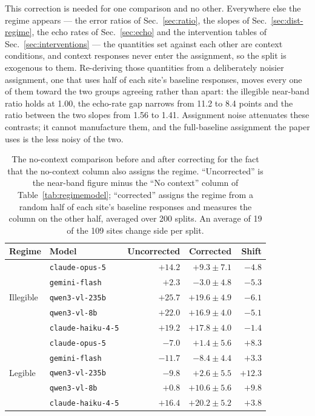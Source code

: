 \documentclass[10pt,a4paper]{article}
\begin{document}
This correction is needed for one comparison and no other. Everywhere else the
regime appears --- the error ratios of Sec.~\ref{sec:ratio}, the slopes of
Sec.~\ref{sec:dist-regime}, the echo rates of Sec.~\ref{sec:echo} and the
intervention tables of Sec.~\ref{sec:interventions} --- the quantities set
against each other are context conditions, and context responses never enter
the assignment, so the split is exogenous to them. Re-deriving those quantities
from a deliberately noisier assignment, one that uses half of each site's
baseline responses, moves every one of them toward the two groups agreeing
rather than apart: the illegible near-band ratio holds at \num{1.00}, the
echo-rate gap narrows from \num{11.2} to \num{8.4} points and the ratio between
the two slopes from \num{1.56} to \num{1.41}. Assignment noise attenuates these
contrasts; it cannot manufacture them, and the full-baseline assignment the
paper uses is the less noisy of the two.

\begin{table}[!htbp]
\centering
\small
\caption{The no-context comparison before and after correcting for the fact
that the no-context column also assigns the regime. ``Uncorrected'' is the
near-band figure minus the ``No context'' column of Table~\ref{tab:regimemodel};
``corrected'' assigns the regime from a random half of each site's baseline
responses and measures the column on the other half, averaged over \num{200}
splits. An average of \num{19} of the \num{109} sites change side per split.}
\label{tab:splithalf}
\begin{tabular}{llrrr}
\toprule
Regime & Model & Uncorrected & Corrected & Shift \\
\midrule
\multirow{5}{*}{Illegible}
 & \texttt{claude-opus-5}    & $+14.2$ & $+9.3 \pm 7.1$  & $-4.8$ \\
 & \texttt{gemini-flash}     & $+2.3$  & $-3.0 \pm 4.8$  & $-5.3$ \\
 & \texttt{qwen3-vl-235b}    & $+25.7$ & $+19.6 \pm 4.9$ & $-6.1$ \\
 & \texttt{qwen3-vl-8b}      & $+22.0$ & $+16.9 \pm 4.0$ & $-5.1$ \\
 & \texttt{claude-haiku-4-5} & $+19.2$ & $+17.8 \pm 4.0$ & $-1.4$ \\
\midrule
\multirow{5}{*}{Legible}
 & \texttt{claude-opus-5}    & $-7.0$  & $+1.4 \pm 5.6$  & $+8.3$ \\
 & \texttt{gemini-flash}     & $-11.7$ & $\mathbf{-8.4 \pm 4.4}$ & $+3.3$ \\
 & \texttt{qwen3-vl-235b}    & $-9.8$  & $+2.6 \pm 5.5$  & $+12.3$ \\
 & \texttt{qwen3-vl-8b}      & $+0.8$  & $+10.6 \pm 5.6$ & $+9.8$ \\
 & \texttt{claude-haiku-4-5} & $+16.4$ & $+20.2 \pm 5.2$ & $+3.8$ \\
\bottomrule
\end{tabular}
\end{table}
\end{document}
